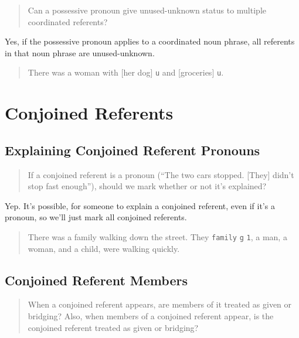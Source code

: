 \documentclass[
]{book}
\begin{document}
\begin{quote}
Can a possessive pronoun give unused-unknown status to multiple coordinated referents?
\end{quote}

Yes,
if the possessive pronoun applies to a coordinated noun phrase,
all referents in that noun phrase are unused-unknown.

\begin{quote}
There was a woman with {[}her dog{]} \texttt{u} and {[}groceries{]} \texttt{u}.
\end{quote}

\hypertarget{conjoined-referents}{%
\section{Conjoined Referents}\label{conjoined-referents}}

\hypertarget{explaining-conjoined-referent-pronouns}{%
\subsection{Explaining Conjoined Referent Pronouns}\label{explaining-conjoined-referent-pronouns}}

\begin{quote}
If a conjoined referent is a pronoun
(``The two cars stopped. {[}They{]} didn't stop fast enough''),
should we mark whether or not it's explained?
\end{quote}

Yep.
It's possible, for someone to explain a conjoined referent, even if it's a pronoun, so we'll just mark all conjoined referents.

\begin{quote}
There was a family walking down the street.
They \texttt{family} \texttt{g} \texttt{1}, a man, a woman, and a child, were walking quickly.
\end{quote}

\hypertarget{conjoined-referent-members}{%
\subsection{Conjoined Referent Members}\label{conjoined-referent-members}}

\begin{quote}
When a conjoined referent appears, are members of it treated as given or bridging?
Also, when members of a conjoined referent appear, is the conjoined referent treated as given or bridging?
\end{quote}
\end{document}

